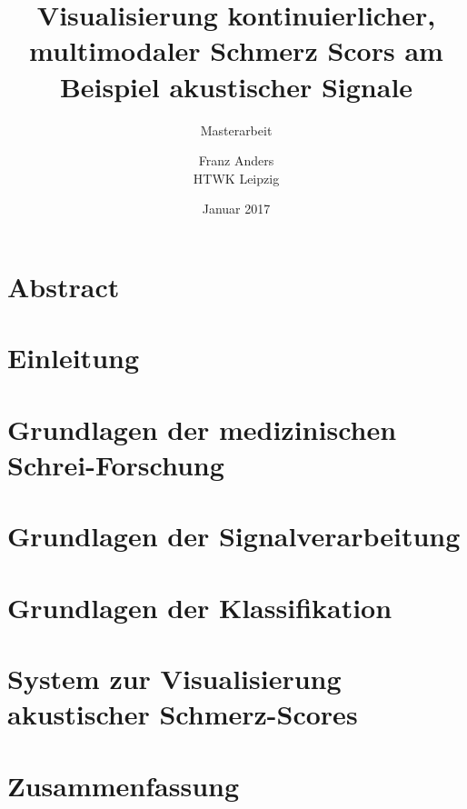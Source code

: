 \documentclass{scrreprt}
\title{Visualisierung kontinuierlicher, multimodaler Schmerz Scors am Beispiel akustischer Signale}
\subtitle{Masterarbeit}
\author{Franz Anders \\ HTWK Leipzig }
\date{Januar 2017}
\begin{document}
\maketitle
\chapter*{Abstract}

\tableofcontents
\listoffigures

\chapter{Einleitung}

\chapter{Grundlagen der medizinischen Schrei-Forschung}


\chapter{Grundlagen der Signalverarbeitung}


\chapter{Grundlagen der Klassifikation}


\chapter{System zur Visualisierung akustischer Schmerz-Scores}


\chapter{Zusammenfassung}



\end{document}
